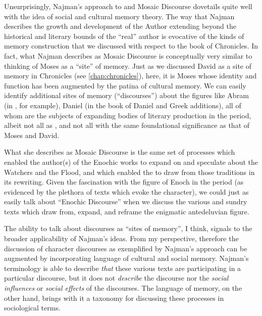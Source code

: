 Unsurprisingly, Najman's approach to \jub and Mosaic Discourse dovetails quite well with the idea of social and cultural memory theory. The way that Najman describes the growth and development of the Author extending beyond the historical and literary bounds of the ``real'' author is evocative of the kinds of memory construction that we discussed with respect to the book of Chronicles. In fact, what Najman describes as Mosaic Discourse is conceptually very similar to thinking of Moses as a ``site'' of memory. Just as we discussed David as a site of memory in Chronicles (see \autoref{chap:chronicles}), here, it is Moses whose identity and function has been augmented by the patina of cultural memory. We can easily identify additional sites of memory (``discourses'') about the figures like Abram (in \ga, for example), Daniel (in the book of Daniel and Greek additions), all of whom are the subjects of expanding bodies of literary production in the \secondtemple period, albeit not all as \psa, and not all with the same foundational significance as that of Moses and David.

What she describes as Mosaic Discourse is the same set of processes which enabled the author(s) of the Enochic works to expand on and speculate about the Watchers and the Flood, and which enabled the \ga to draw from those traditions in its rewriting. Given the fascination with the figure of Enoch in the \secondtemple period (as evidenced by the plethora of texts which evoke the character), we could just as easily talk about ``Enochic Discourse'' when we discuss the various and sundry texts which draw from, expand, and reframe the enigmatic antedeluvian figure.

The ability to talk about discourses as ``sites of memory'', I think, signals to the broader applicability of Najman's ideas. From my perspective, therefore the discussion of character discourses as exemplified by Najman's approach can be augmented by incorporating language of cultural and social memory. Najman's terminology is able to describe \emph{that} these various texts are participating in a particular discourse, but it does not \emph{describe} the discourse nor the \emph{social influences} or \emph{social effects} of the discourses. The language of memory, on the other hand, brings with it a taxonomy for discussing these processes in sociological terms.


